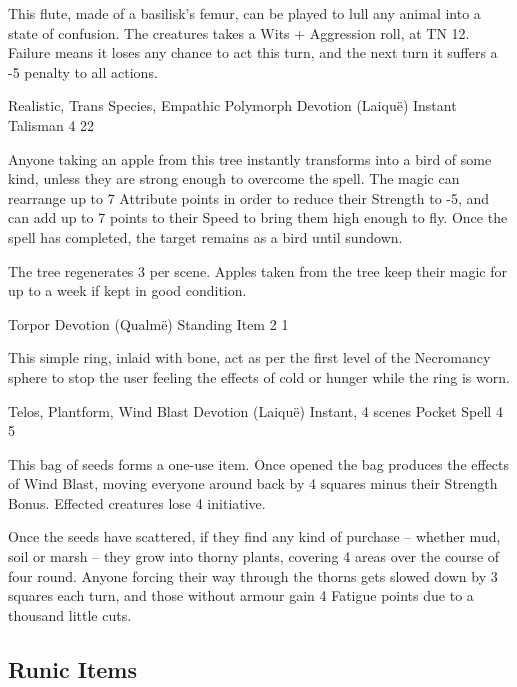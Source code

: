 \begin{multicols}{2}
This flute, made of a basilisk's femur, can be played to lull any animal into a state of confusion.
The creatures takes a Wits + Aggression roll, at TN 12.
Failure means it loses any chance to act this turn, and the next turn it suffers a -5 penalty to all actions.

	{Realistic, Trans Species, Empathic Polymorph}%
	{Devotion (Laiqu\"{e})}%
	{Instant}%
	{Talisman}%
	{4}%
	{22}%

Anyone taking an apple from this tree instantly transforms into a bird of some kind, unless they are strong enough to overcome the spell.  The magic can rearrange up to 7 Attribute points in order to reduce their Strength to -5, and can add up to 7 points to their Speed to bring them high enough to fly.  Once the spell has completed, the target remains as a bird until sundown.

The tree regenerates 3 per scene.  Apples taken from the tree keep their magic for up to a week if kept in good condition.

	{Torpor}%
	{Devotion (Qualm\"{e})}%
	{Standing}%
	{Item}%
	{2}%
	{1}\label{ring_asphyxiation}%

This simple ring, inlaid with bone, act as per the first level of the Necromancy sphere to stop the user feeling the effects of cold or hunger while the ring is worn.

	{Telos, Plantform, Wind Blast}%
	{Devotion (Laiqu\"{e})}%
	{Instant, 4 scenes}%
	{Pocket Spell}%
	{4}%
	{5}%

This bag of seeds forms a one-use item.
Once opened the bag produces the effects of Wind Blast, moving everyone around back by 4 squares minus their Strength Bonus.
Effected creatures lose 4 initiative.

Once the seeds have scattered, if they find any kind of purchase -- whether mud, soil or marsh -- they grow into thorny plants, covering 4 areas over the course of four round.
Anyone forcing their way through the thorns gets slowed down by 3 squares each turn, and those without armour gain 4 Fatigue points due to a thousand little cuts.

\subsection{Runic Items}


\end{multicols}
